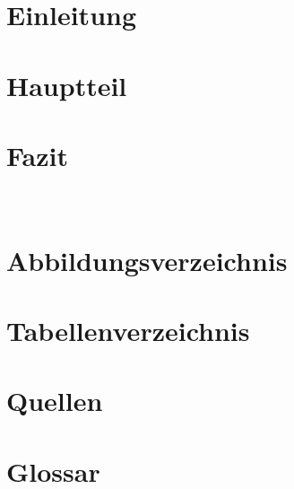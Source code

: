 \documentclass[11pt]{article}
\begin{document}
    
    \pagebreak
    \tableofcontents
    \pagebreak
    \section{Einleitung}
    
    \pagebreak
    \section{Hauptteil}
    
    \pagebreak
    \section{Fazit}
    \\
    \pagebreak
    \section{Abbildungsverzeichnis}
    
    \pagebreak
    \section{Tabellenverzeichnis}
    \listoftables
    \pagebreak
    \section{Quellen}
    
    \pagebreak
    \section{Glossar}
    
\end{document}
